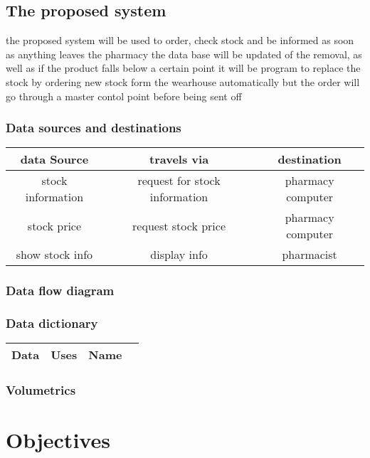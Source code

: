 \subsection{The proposed system}
the proposed system will be used to order, check stock and be informed as soon as anything leaves the pharmacy the data base will be updated of the removal, as well as if the product falls below a certain point it will be program to replace the stock by ordering new stock form the wearhouse automatically but the order will go through a master contol point before being sent off 
\subsubsection{Data sources and destinations}
\begin{table}
\begin{tabular}{|c|c|c|}
\hline\hline
data Source & travels via & destination\\
\hline
stock information & request for stock information & pharmacy computer\\
\hline
stock price & request stock price & pharmacy computer\\
\hline
show stock info & display info & pharmacist\\ 
\hline
\end{tabular}
\label{table:nonlin}

\end{table}
\subsubsection{Data flow diagram}

\subsubsection{Data dictionary}
\begin{table}
\begin{tabular}{|c|c|c|c|}
\hline
Data & Uses & Name \\
\hline

\end{tabular}
\label{table:nonlin}
\end{table}

\subsubsection{Volumetrics}

\section{Objectives}

